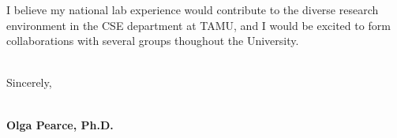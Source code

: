 \documentclass[10pt,letterpaper]{moderncv/moderncv}
\begin{document}
I believe my national lab experience would contribute to the diverse research environment in the CSE department at TAMU, and I would be excited to form collaborations with several groups thoughout the University.





\ \\

Sincerely,

\ \\

\textbf{Olga Pearce, Ph.D.}
\end{document}
